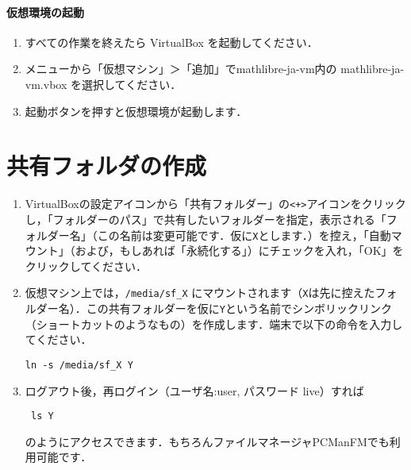 \documentclass[a4j]{ltjsarticle}
\newcommand{\vm}{mathlibre-ja-vm}
\begin{document}

\paragraph{仮想環境の起動}
\begin{enumerate}
 \item すべての作業を終えたら VirtualBox を起動してください．
 \item メニューから「仮想マシン」＞「追加」で\vm 内の \vm.vbox を選択してください．
 \item 起動ボタンを押すと仮想環境が起動します．
\end{enumerate}

\section{共有フォルダの作成}
\begin{enumerate}
 \item VirtualBoxの設定アイコンから「共有フォルダー」の\verb|<+>|アイコンをクリックし，「フォルダーのパス」で共有したいフォルダーを指定，表示される「フォルダー名」（この名前は変更可能です．仮に\verb|X|とします．）を控え，「自動マウント」（および，もしあれば「永続化する」）にチェックを入れ，「OK」をクリックしてください．
 \item 仮想マシン上では，\verb|/media/sf_X| にマウントされます（\verb|X|は先に控えたフォルダー名）．この共有フォルダーを仮に\verb|Y|という名前でシンボリックリンク（ショートカットのようなもの）を作成します．端末で以下の命令を入力してください．
\begin{lstlisting}
ln -s /media/sf_X Y
\end{lstlisting}
\item ログアウト後，再ログイン（ユーザ名:user, パスワード live）すれば
\begin{lstlisting}
 ls Y
\end{lstlisting}
のようにアクセスできます．もちろんファイルマネージャPCManFMでも利用可能です．
\end{enumerate}

\end{document}
